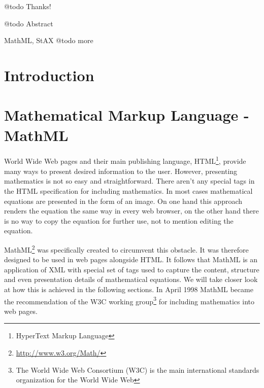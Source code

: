 \documentclass[11pt,oneside,final]{fithesis2}
\begin{document}
\sloppy




\FrontMatter
\ThesisTitlePage

\begin{ThesisDeclaration}
\DeclarationText
\AdvisorName
\end{ThesisDeclaration}

\begin{ThesisThanks}
@todo Thanks!
\end{ThesisThanks}

\begin{ThesisAbstract}
@todo Abstract
\end{ThesisAbstract}

\begin{ThesisKeyWords}
MathML, StAX  @todo more
\end{ThesisKeyWords}

\MainMatter
\tableofcontents

\chapter{Introduction}


\chapter{Mathematical Markup Language - MathML}
World Wide Web pages and their main publishing language, HTML\footnote{HyperText Markup Language}, provide many ways to present desired information to the user. However, presenting mathematics is not so easy and straightforward. There aren't any special tags in the HTML specification for including mathematics. In most cases mathematical equations are presented in the form of an image. On one hand this approach renders the equation the same way in every web browser, on the other hand there is no way to copy the equation for further use, not to mention editing the equation. 

MathML\footnote{\url{http://www.w3.org/Math/}} was specifically created to circumvent this obstacle. It was therefore designed to be used in web pages alongside HTML. It follows that MathML is an application of XML with special set of tags used to capture the content, structure and even presentation details of mathematical equations. We will take closer look at how this is achieved in the following sections. In April 1998 MathML became the recommendation of the W3C working group\footnote{The World Wide Web Consortium (W3C) is the main international standards organization for the World Wide Web} for including mathematics into web pages.
\end{document}
